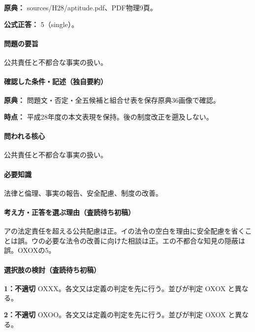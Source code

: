 \noindent\textbf{原典：} sources/H28/aptitude.pdf、PDF物理9頁。

\textbf{公式正答：} 5（single）。

\paragraph{問題の要旨} 公共責任と不都合な事実の扱い。

\paragraph{確認した条件・記述（独自要約）}\mbox{}\par

\noindent\textbf{原典：} 問題文・否定・全五候補と組合せ表を保存原典36画像で確認。\par

\noindent\textbf{時点：} 平成28年度の本文表現を保持。後の制度改正を遡及しない。\par

\paragraph{問われる核心} 公共責任と不都合な事実の扱い。

\paragraph{必要知識} 法律と倫理、事実の報告、安全配慮、制度の改善。

\paragraph{考え方・正答を選ぶ理由（査読待ち初稿）} アの法定責任を超える公共配慮は正。イの法令の空白を理由に安全配慮を省くことは誤。ウの必要な法令の改善に向けた相談は正。エの不都合な知見の隠蔽は誤。OXOXの5。

\paragraph{選択肢の検討（査読待ち初稿）}\mbox{}\par

\noindent\textbf{1：不適切} OXXX。各文又は定義の判定を先に行う。並びが判定 OXOX と異なる。\par

\noindent\textbf{2：不適切} OXOO。各文又は定義の判定を先に行う。並びが判定 OXOX と異なる。\par

